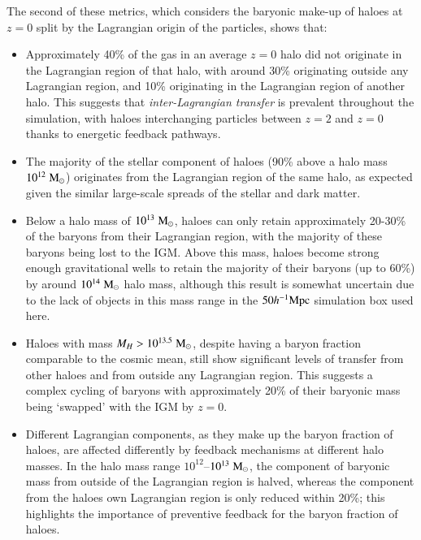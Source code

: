 \documentclass[fleqn,usenatbib]{mnras}
\newcommand{\hmpc}{h^{-1}{\rm Mpc}}
\newcommand{\msolar}{\;{\rm M}_{\odot}}
\begin{document}
The second of these metrics, which considers the baryonic make-up of haloes
at $z=0$ split by the Lagrangian origin of the particles, shows that:
\begin{itemize}
    \item Approximately 40\% of the gas in an average $z=0$ halo did not originate
          in the Lagrangian region of that halo, with around 30\% originating
          outside any Lagrangian region, and 10\% originating in the Lagrangian
          region of another halo. This suggests that \emph{inter-Lagrangian
          transfer} is prevalent throughout the simulation, with haloes interchanging
          particles between $z=2$ and $z=0$ thanks to energetic feedback pathways.
    \item The majority of the stellar component of haloes (90\% above a halo mass
          $10^{12}\msolar{}$) originates from the Lagrangian region of the
          same halo, as expected given the similar large-scale spreads of the
          stellar and dark matter.
    \item Below a halo mass of $10^{13}\msolar{}$, haloes can only retain
          approximately 20-30\% of the baryons from their Lagrangian region,
          with the majority of these baryons being lost to the IGM. Above
          this mass, haloes become strong enough gravitational wells to
          retain the majority of their baryons (up to 60\%) by around
          $10^{14}\msolar{}$ halo mass, although this result is somewhat
          uncertain due to the lack of objects in this mass range in the
          $50\hmpc{}$ simulation box used here.
    \item Haloes with mass $M_H > 10^{13.5}\msolar{}$, despite having a baryon
          fraction comparable to the cosmic mean, still show significant
          levels of transfer from other haloes and from outside any
          Lagrangian region. This suggests a complex cycling of baryons with
          approximately 20\% of their baryonic mass being `swapped' with the
          IGM by $z=0$.
    \item Different Lagrangian components, as they make up the baryon
          fraction of haloes, are affected differently by feedback mechanisms
          at different halo masses. In the halo mass range
          $10^{12}$--$10^{13}\msolar{}$, the component of baryonic mass from
          outside of the Lagrangian region is halved, whereas the component
          from the haloes own Lagrangian region is only reduced within 20\%;
          this highlights the importance of preventive feedback for the
          baryon fraction of haloes.
\end{itemize}
\end{document}
